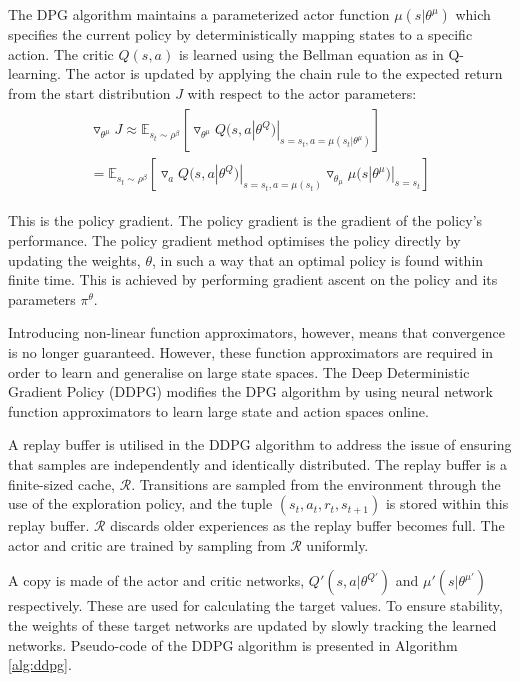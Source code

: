 The DPG algorithm maintains a parameterized actor function $\mu(s|\theta^\mu)$ which specifies the current policy by deterministically mapping states to a specific action. The critic $Q(s,a)$ is learned using the Bellman equation as in Q-learning. The actor is updated by applying the chain rule to the expected return from the start distribution $J$ with respect to the actor parameters:
\begin{align}
\begin{split}
\triangledown_{\theta^\mu}J\approx\mathbb{E}_{s_t\sim\rho^\beta}[\triangledown_{\theta^\mu}Q(s,a|\theta^Q)|_{s=s_t,a=\mu(s_t|\theta^\mu)}] \\
= \mathbb{E}_{s_t\sim\rho^\beta}[\triangledown_aQ(s,a|\theta^Q)|_{s=s_t,a=\mu(s_t)}\triangledown_{\theta_\mu}\mu(s|\theta^\mu)|_{s=s_t}]
\end{split}
\end{align}

This is the policy gradient. The policy gradient is the gradient of the policy's performance. The policy gradient method optimises the policy directly by updating the weights, $\theta$, in such a way that an optimal policy is found within finite time. This is achieved by performing gradient ascent on the policy and its parameters $\pi^\theta$.

Introducing non-linear function approximators, however, means that convergence is no longer guaranteed. However, these function approximators are required in order to learn and generalise on large state spaces. The Deep Deterministic Gradient Policy (DDPG) modifies the DPG algorithm by using neural network function approximators to learn large state and action spaces online.

A replay buffer is utilised in the DDPG algorithm to address the issue of ensuring that samples are independently and identically distributed. The replay buffer is a finite-sized cache, $\mathcal{R}$. Transitions are sampled from the environment through the use of the exploration policy, and the tuple $(s_t,a_t,r_t,s_{t+1})$ is stored within this replay buffer. $\mathcal{R}$ discards older experiences as the replay buffer becomes full. The actor and critic are trained by sampling from $\mathcal{R}$ uniformly. 

A copy is made of the actor and critic networks, $Q'(s,a|\theta^{Q'})$ and $\mu'(s|\theta^{\mu'})$ respectively. These are used for calculating the target values. To ensure stability, the weights of these target networks are updated by slowly tracking the learned networks. Pseudo-code of the DDPG algorithm is presented in Algorithm \ref{alg:ddpg}.

